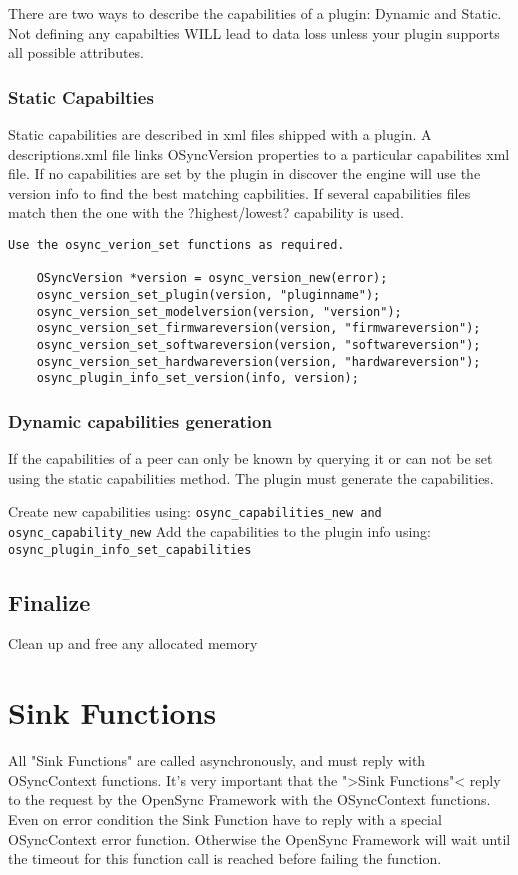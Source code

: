 There are two ways to describe the capabilities of a plugin: Dynamic and Static.
Not defining any capabilties WILL lead to data loss unless your plugin supports
all possible attributes.
\subsubsection{Static Capabilties}
Static capabilities are described in xml files shipped with a plugin.  A
descriptions.xml file links OSyncVersion properties to a particular capabilites
xml file. If no capabilities are set by the plugin in discover the engine will
use the version info to find the best matching capbilities.  If several
capabilities files match then the one with the ?highest/lowest? capability is
used.

\begin{verbatim}
Use the osync_verion_set functions as required.

	OSyncVersion *version = osync_version_new(error);
	osync_version_set_plugin(version, "pluginname");
	osync_version_set_modelversion(version, "version");
	osync_version_set_firmwareversion(version, "firmwareversion");
	osync_version_set_softwareversion(version, "softwareversion");
	osync_version_set_hardwareversion(version, "hardwareversion");
	osync_plugin_info_set_version(info, version);
\end{verbatim}

\subsubsection{Dynamic capabilities generation}
If the capabilities of a peer can only be known by querying it or can not be set using the
static capabilities method. The plugin must generate the capabilities.

Create new capabilities using:
\verb|osync_capabilities_new and osync_capability_new|
Add the capabilities to the plugin info using:
\verb|osync_plugin_info_set_capabilities|
\subsection{Finalize}
Clean up and free any allocated memory
\section{Sink Functions}
All "Sink Functions" are called asynchronously, and must reply with OSyncContext functions.
 It's very important that the ">Sink Functions"< reply to the
request by the OpenSync Framework with the OSyncContext functions. Even on
error condition the Sink Function have to reply with a special OSyncContext
error function. Otherwise the OpenSync Framework will wait until the timeout for this
function call is reached before failing the function.

